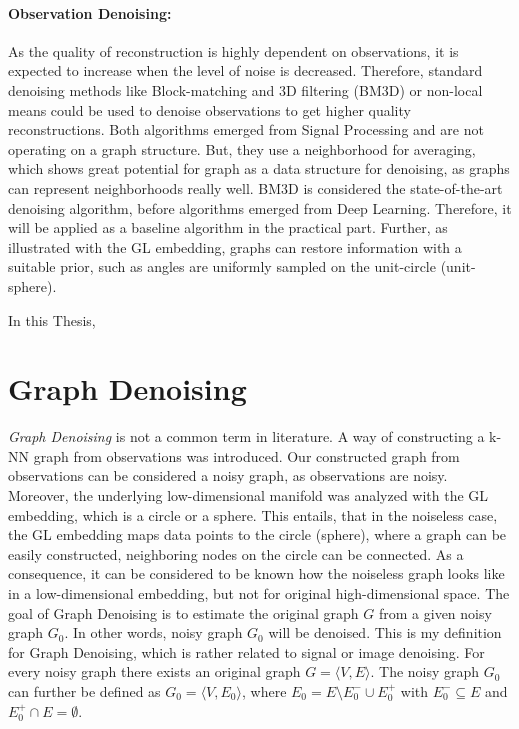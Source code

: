   \paragraph{Observation Denoising:}
  As the quality of reconstruction is highly dependent on observations, it
  is expected to increase when the level of noise is decreased.
  Therefore, standard denoising methods like Block-matching and 3D filtering (BM3D) \cite{bm3d} or 
  non-local means \cite{noneLocalMean} could be used to denoise observations to get higher quality reconstructions.
  Both algorithms emerged from Signal Processing and are not operating on a graph structure. 
  But, they use a neighborhood for averaging, which shows great potential for graph 
  as a data structure for denoising, as graphs can represent neighborhoods really well.
  BM3D is considered the state-of-the-art denoising algorithm, before algorithms emerged from Deep Learning.
  Therefore, it will be applied as a baseline algorithm in the practical part.
  Further, as illustrated with the GL embedding, graphs can restore information with a suitable prior,
  such as angles are uniformly sampled on the unit-circle (unit-sphere). 

  In this Thesis, 

\section{Graph Denoising}
\textit{Graph Denoising} is not a common term in literature.
A way of constructing a k-NN graph from observations was introduced.
Our constructed graph from observations can be considered a noisy graph, as observations are noisy. 
Moreover, the underlying low-dimensional manifold was analyzed with the GL embedding, which is a circle or a sphere.
This entails, that in the noiseless case, the GL embedding maps data points to the circle (sphere), 
where a graph can be easily constructed, neighboring nodes on the circle can be connected.
As a consequence, it can be considered to be known how the noiseless graph looks like in
a low-dimensional embedding, but not for original high-dimensional space. 
The goal of Graph Denoising is to estimate the original graph $G$ from a given noisy graph $G_0$.
In other words, noisy graph $G_0$ will be denoised.
This is my definition for Graph Denoising, which is rather related to signal or image denoising.
For every noisy graph there exists an original graph $G = \langle V,E \rangle$.
The noisy graph $G_0$ can further be defined as $G_0 = \langle V, E_0 \rangle$,  
 where $E_0 = E \setminus  E^{-}_0 \cup  E^{+}_0$ with $E^{-}_0 \subseteq E$ and $E^{+}_0 \cap E = \emptyset$.

